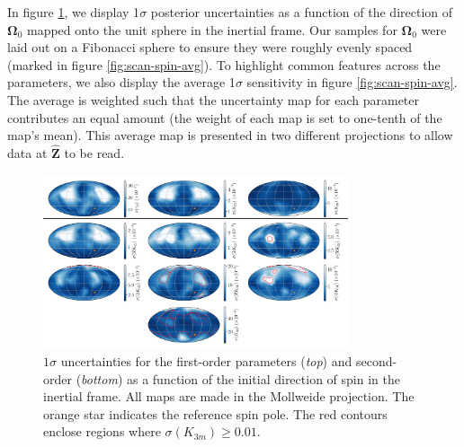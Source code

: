 \documentclass[fleqn,usenatbib]{mnras}
\newcommand{\unit}[1]{\bm{\hat{#1}}}
\begin{document}
In figure \ref{fig:scan-spin}, we display 1$\sigma$ posterior uncertainties as a function of the direction of $\bm \Omega_0$ mapped onto the unit sphere in the inertial frame. Our samples for $\bm \Omega_0$ were laid out on a Fibonacci sphere to ensure they were roughly evenly spaced (marked in figure \ref{fig:scan-spin-avg}). To highlight common features across the parameters, we also display the average 1$\sigma$ sensitivity in figure \ref{fig:scan-spin-avg}. The average is weighted such that the uncertainty map for each parameter contributes an equal amount (the weight of each map is set to one-tenth of the map's mean). This average map is presented in two different projections to allow data at $\unit Z$ to be read.

\begin{figure}
  \centering
  \includegraphics[width=0.8\textwidth]{figs/spin-pole.png}
  \caption{$1\sigma$ uncertainties for the first-order parameters (\textit{top}) and second-order (\textit{bottom}) as a function of the initial direction of spin in the inertial frame. All maps are made in the Mollweide projection. The orange star indicates the reference spin pole. The red contours enclose regions where $\sigma(K_{3m}) \geq 0.01$.}
  \label{fig:scan-spin}
\end{figure}
\end{document}
